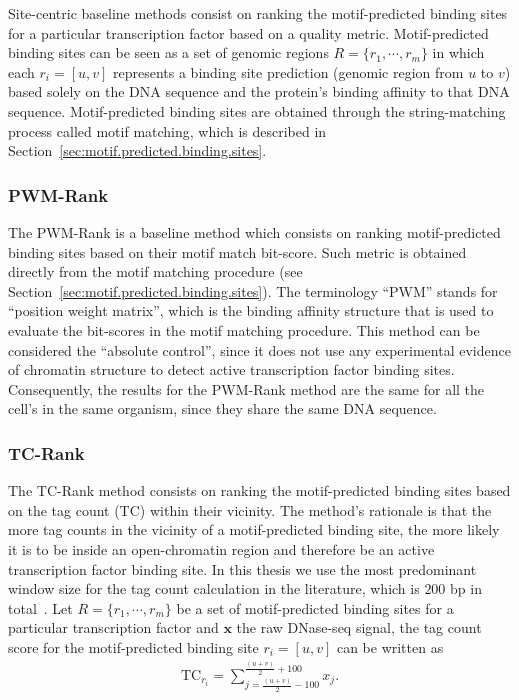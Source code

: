 Site-centric baseline methods consist on ranking the motif-predicted binding sites for a particular transcription factor based on a quality metric. Motif-predicted binding sites can be seen as a set of genomic regions $R = \{ {r}_{1}, \cdots, {r}_{m} \}$ in which each ${r}_{i} = [u,v]$ represents a binding site prediction (genomic region from $u$ to $v$) based solely on the DNA sequence and the protein's binding affinity to that DNA sequence. Motif-predicted binding sites are obtained through the string-matching process called motif matching, which is described in Section~\ref{sec:motif.predicted.binding.sites}.

\subsubsection{PWM-Rank}
\label{sec:pwm.rank}

The PWM-Rank is a baseline method which consists on ranking motif-predicted binding sites based on their motif match bit-score. Such metric is obtained directly from the motif matching procedure (see Section~\ref{sec:motif.predicted.binding.sites}). The terminology ``PWM'' stands for ``position weight matrix'', which is the binding affinity structure that is used to evaluate the bit-scores in the motif matching procedure. This method can be considered the ``absolute control'', since it does not use any experimental evidence of chromatin structure to detect active transcription factor binding sites. Consequently, the results for the PWM-Rank method are the same for all the cell's in the same organism, since they share the same DNA sequence.

\subsubsection{TC-Rank}
\label{sec:tc.rank}

The TC-Rank method consists on ranking the motif-predicted binding sites based on the tag count (TC) within their vicinity. The method's rationale is that the more tag counts in the vicinity of a motif-predicted binding site, the more likely it is to be inside an open-chromatin region and therefore be an active transcription factor binding site. In this thesis we use the most predominant window size for the tag count calculation in the literature, which is $200$ bp in total~\cite{cuellar2012,yardimci2014,he2014}. Let $R = \{ {r}_{1}, \cdots, {r}_{m} \}$ be a set of motif-predicted binding sites for a particular transcription factor and $\mathbf{x}$ the raw DNase-seq signal, the tag count score for the motif-predicted binding site ${r}_{i} = [u,v]$ can be written as
\begin{align}
\text{TC}_{{r}_{i}} = \sum_{j=\frac{(u+v)}{2} - 100}^{\frac{(u+v)}{2} + 100} {x}_{j}.
\label{eq:tc}
\end{align}

